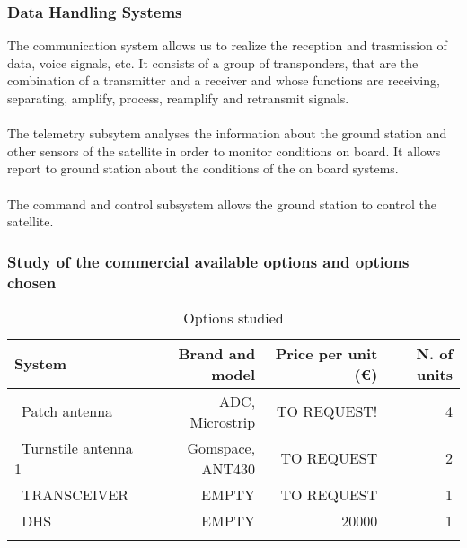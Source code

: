 \subsubsection{Data Handling Systems}

The communication system allows us to realize the reception and trasmission of data, voice signals, etc. It consists of a group of transponders, that are the combination of a transmitter and a receiver and whose functions are receiving, separating, amplify, process, reamplify and retransmit signals.
	\paragraph{} 
	The telemetry subsytem analyses the information about the ground station and other sensors of the satellite in 	order to monitor conditions on board. It allows report to ground station about the conditions of the on board 			systems.
	\paragraph{} 
	The command and control subsystem allows the ground station to control the satellite.

\subsubsection{Study of the commercial available options and options chosen}


\begin{longtable}{| l | r | r | r |}
	\hline
	\rowcolor[gray]{0.80}	\textbf{System} &  \textbf{Brand and model}     & \textbf{Price per unit (\euro)} & \textbf{N. of units}  \\
	\hline
	\endfirsthead
	
	~Patch antenna & ADC, Microstrip & TO REQUEST! & 4 \\
	~Turnstile antenna 1 & Gomspace, ANT430 & TO REQUEST & 2 \\
	~TRANSCEIVER & EMPTY & TO REQUEST & 1 \\
	~DHS & EMPTY & 20000 & 1 \\
	\hline
	
	\caption{Options studied}
	\label{payloadoptionstable}
\end{longtable}

